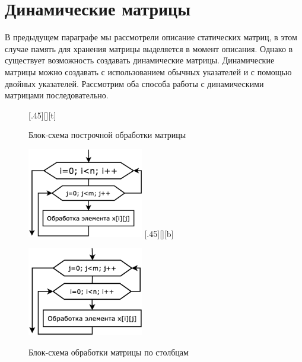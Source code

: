 \section{Динамические матрицы}
В предыдущем параграфе мы рассмотрели описание статических матриц, в этом случае память для хранения матрицы выделяется
в момент описания. Однако в  существует возможность создавать динамические матрицы. Динамические матрицы
можно создавать с использованием обычных указателей и с помощью двойных указателей. Рассмотрим оба способа работы с
динамическими матрицами последовательно. 

\begin{figure}[H]
\begin{floatrow}
[.45\textwidth][\FBheight][t]
{\caption{Блок-схема построчной обработки матрицы}
\label{ch06:refDrawing0}}
{\includegraphics[width=0.45\textwidth,keepaspectratio]{img/ris_6_1}}\hspace*{0.05\textwidth}
%
[.45\textwidth][\FBheight][b]
{\caption{Блок-схема обработки матрицы по столбцам}
\label{ch06:refDrawing1}}
{\includegraphics[width=0.45\textwidth,keepaspectratio]{img/ris_6_2}}
\end{floatrow}
\end{figure}


